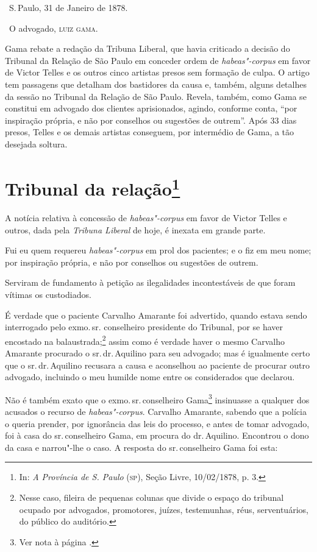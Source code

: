 \bigskip

\hfill\ S.\,Paulo, 31 de Janeiro de 1878.\smallskip

\hfill\ O advogado, \textsc{luiz gama}.

\paginabranca
\mbox{}\vfill
\thispagestyle{empty}

{\small\noindent
Gama rebate a redação da Tribuna
Liberal, que havia criticado a decisão do Tribunal da Relação de São
Paulo em conceder ordem de \emph{habeas"-corpus} em favor de Victor
Telles e os outros cinco artistas presos sem formação de culpa. O artigo
tem passagens que detalham dos bastidores da causa e, também, alguns
detalhes da sessão no Tribunal da Relação de São Paulo. Revela, também,
como Gama se constitui em advogado dos clientes aprisionados, agindo,
conforme conta, ``por inspiração própria, e não por conselhos ou
sugestões de outrem''. Após 33 dias presos, Telles e os demais artistas
conseguem, por intermédio de Gama, a tão desejada soltura. }

\chapter{Tribunal da relação\footnote[*]{In: \emph{A Província de S.
  Paulo} (\textsc{sp}), Seção Livre, 10/02/1878, p. 3.}}

A notícia relativa à concessão de \emph{habeas"-corpus} em favor de
Victor Telles e outros, dada pela \emph{Tribuna Liberal} de hoje, é
inexata em grande parte.

Fui eu quem requereu \emph{habeas"-corpus} em prol dos pacientes; e o fiz
em meu nome; por inspiração própria, e não por conselhos ou sugestões de
outrem.

Serviram de fundamento à petição as ilegalidades incontestáveis de que
foram vítimas os custodiados.

É verdade que o paciente Carvalho Amarante foi advertido, quando estava
sendo interrogado pelo exmo.\,sr. conselheiro presidente do Tribunal, por
se haver encostado na balaustrada;\footnote{Nesse caso, fileira de
  pequenas colunas que divide o espaço do tribunal ocupado por
  advogados, promotores, juízes, testemunhas, réus, serventuários, do
  público do auditório.} assim como é verdade haver o mesmo Carvalho
Amarante procurado o sr.\,dr.\,Aquilino para seu advogado; mas é
igualmente certo que o sr.\,dr.\,Aquilino recusara a causa e aconselhou ao
paciente de procurar outro advogado, incluindo o meu humilde nome entre
os considerados que declarou.

Não é também exato que o exmo.\,sr.\,conselheiro Gama\footnote{Ver nota à página \pageref{agostinho}.} insinuasse a
qualquer dos acusados o recurso de \emph{habeas"-corpus}. Carvalho
Amarante, sabendo que a polícia o queria prender, por ignorância das
leis do processo, e antes de tomar advogado, foi à casa do sr.\,conselheiro Gama, em procura do dr.\,Aquilino. Encontrou o dono da casa e
narrou"-lhe o caso. A resposta do sr.\,conselheiro Gama foi esta:

